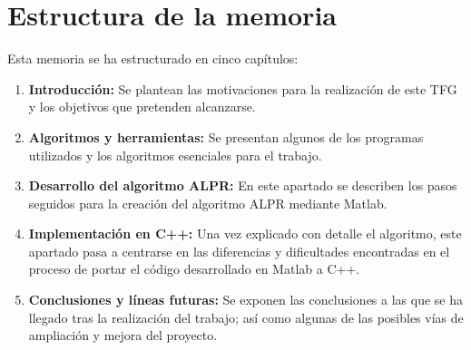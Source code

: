 \section{Estructura de la memoria}
Esta memoria se ha estructurado en cinco capítulos:
\begin{enumerate}
\item \textbf{Introducción:} Se plantean las motivaciones para la realización de este \ac{TFG} y los objetivos que pretenden alcanzarse.

\item \textbf{Algoritmos y herramientas:} Se presentan algunos de los programas utilizados y los algoritmos esenciales para el trabajo.

\item \textbf{Desarrollo del algoritmo \ac{ALPR}:} En este apartado se describen los pasos seguidos para la creación del algoritmo \ac{ALPR} mediante Matlab.

\item \textbf{Implementación en C++:} Una vez explicado con detalle el algoritmo, este apartado pasa a centrarse en las diferencias y dificultades encontradas en el proceso de portar el código desarrollado en Matlab a C++.

\item \textbf{Conclusiones y líneas futuras:} Se exponen las conclusiones a las que se ha llegado tras la realización del trabajo; así como algunas de las posibles vías de ampliación y mejora del proyecto.
\end{enumerate}
